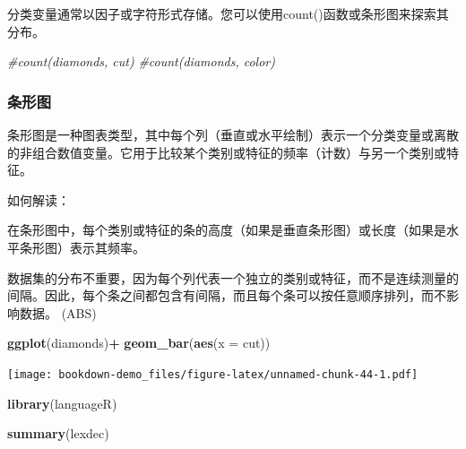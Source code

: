 \documentclass[]{book}
\newenvironment{Shaded}{\begin{snugshade}}{\end{snugshade}}
\newcommand{\CommentTok}[1]{\textcolor[rgb]{0.56,0.35,0.01}{\textit{#1}}}
\newcommand{\DataTypeTok}[1]{\textcolor[rgb]{0.13,0.29,0.53}{#1}}
\newcommand{\KeywordTok}[1]{\textcolor[rgb]{0.13,0.29,0.53}{\textbf{#1}}}
\newcommand{\NormalTok}[1]{#1}
\newcommand{\OperatorTok}[1]{\textcolor[rgb]{0.81,0.36,0.00}{\textbf{#1}}}
\newcommand{\StringTok}[1]{\textcolor[rgb]{0.31,0.60,0.02}{#1}}
\begin{document}
分类变量通常以因子或字符形式存储。您可以使用count()函数或条形图来探索其分布。

\begin{Shaded}
\begin{Highlighting}[]
\CommentTok{#count(diamonds, cut)}
\CommentTok{#count(diamonds, color)}
\end{Highlighting}
\end{Shaded}

\hypertarget{ux6761ux5f62ux56fe}{%
\subsubsection{条形图}\label{ux6761ux5f62ux56fe}}

条形图是一种图表类型，其中每个列（垂直或水平绘制）表示一个分类变量或离散的非组合数值变量。它用于比较某个类别或特征的频率（计数）与另一个类别或特征。

如何解读：

在条形图中，每个类别或特征的条的高度（如果是垂直条形图）或长度（如果是水平条形图）表示其频率。

数据集的分布不重要，因为每个列代表一个独立的类别或特征，而不是连续测量的间隔。因此，每个条之间都包含有间隔，而且每个条可以按任意顺序排列，而不影响数据。 (ABS)

\begin{Shaded}
\begin{Highlighting}[]
\KeywordTok{ggplot}\NormalTok{(diamonds)}\OperatorTok{+}
\StringTok{  }\KeywordTok{geom_bar}\NormalTok{(}\KeywordTok{aes}\NormalTok{(}\DataTypeTok{x =}\NormalTok{ cut))}
\end{Highlighting}
\end{Shaded}

\texttt{[image: bookdown-demo\_files/figure-latex/unnamed-chunk-44-1.pdf]}

\begin{Shaded}
\begin{Highlighting}[]
\KeywordTok{library}\NormalTok{(languageR)}

\KeywordTok{summary}\NormalTok{(lexdec)}
\end{Highlighting}
\end{Shaded}
\end{document}
